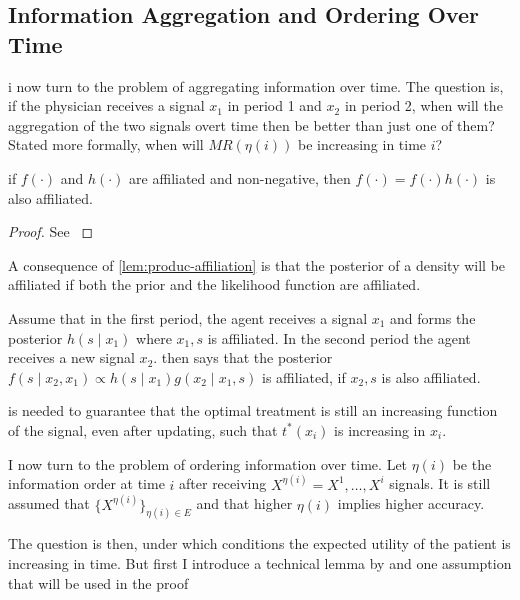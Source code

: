 \documentclass[10pt,a4paper]{article} 					%
\begin{document}
\subsection{Information Aggregation and Ordering Over Time}
i now turn to the problem of aggregating information over time. The question is, if the physician receives a signal \(x_1\) in period 1 and \(x_2\) in period 2, when will the aggregation of the two signals overt time then be better than just one of them? Stated more formally, when will \(MR(\eta(i))\) be increasing in time \(i\)?

\begin{lemma}\label{lem:produc-affiliation}
	if \(f(\cdot)\) and \(h(\cdot)\) are affiliated and non-negative, then \(f(\cdot)=f(\cdot)h(\cdot)\) is also affiliated.
\end{lemma}
\begin{proof}
	See \textcite{Milgrom1982a}
\end{proof}
A consequence of \cref{lem:produc-affiliation} is that the posterior of a density will be affiliated if both the prior and the likelihood function are affiliated.

\begin{example}
 Assume that in the first period, the agent receives a signal \(x_1\) and forms the posterior \(h(s\mid x_1)\) where \(x_1,s\) is affiliated. In the second period the agent receives a new signal \(x_2\).  then says that the posterior \(f(s\mid x_2,x_1) \propto h(s\mid x_1)g(x_2\mid x_1,s)\) is affiliated, if \(x_2,s\) is also affiliated.
 \end{example}

 is needed to guarantee that the optimal treatment is still an increasing function of the signal, even after updating, such that \(t^*(x_i)\) is increasing in \(x_i\).

I now turn to the problem of ordering information over time. Let \(\eta(i)\) be the information order at time \(i\) after receiving \({X}^{\eta(i)}=X^{1},\ldots,X^{i}\) signals. It is still assumed that \(\{{X}^{\eta(i)}\}_{\eta(i)\in E}\) and that higher \(\eta(i)\) implies higher accuracy.

The question is then, under which conditions the expected utility of the patient is increasing in time. But first I introduce a technical lemma by \textcite{Persico1996} and one assumption that will be used in the proof
\end{document}

